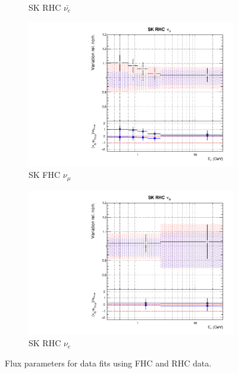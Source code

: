 \begin{figure}[t]
\begin{subfigure}{0.24\textwidth}
  \caption{SK RHC $\bar{\nu_{e}}$}
\end{subfigure}
\begin{subfigure}{0.24\textwidth}
  \centering
  \includegraphics[width=0.95\linewidth]{figs/rhcmpdat28flux_14}
  \caption{SK FHC $\nu_{\mu}$}
\end{subfigure}
\begin{subfigure}{0.24\textwidth}
  \centering
  \includegraphics[width=0.95\linewidth]{figs/rhcmpdat28flux_15}
  \caption{SK RHC $\nu_{e}$}
\end{subfigure}
\caption{Flux parameters for data fits using FHC and RHC data.}
\label{fig:rhcmpidat28SK}
\end{figure}

